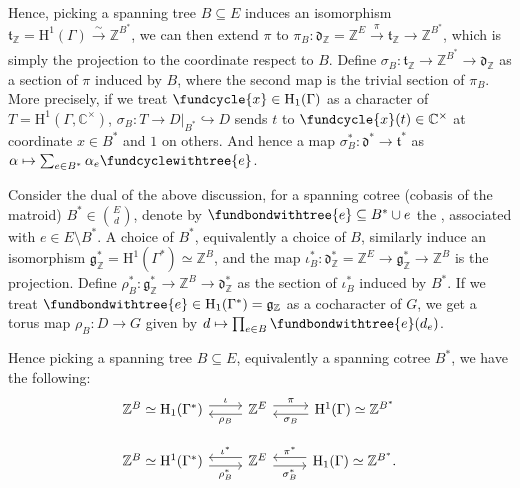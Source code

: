\documentclass[b5paper]{article}
\newcommand{\del}{\setminus}
\newcommand{\HH}{\mathrm{H}}
\begin{document}
Hence, picking a spanning tree $B\subseteq E$ induces an isomorphism $\mathfrak{t}_\mathbb{Z}=\HH^1(\Gamma) \xrightarrow[]{\sim }\mathbb{Z}^{B^*}$, we can then extend $\pi$ to $\pi_B:\mathfrak{d}_\mathbb{Z}=\mathbb{Z}^E\xrightarrow[]{\pi} \mathfrak{t}_\mathbb{Z}\rightarrow \mathbb{Z}^{B^*}$, which is simply the projection to the coordinate respect to $B$. Define $\sigma_B:\mathfrak{t}_\mathbb{Z}\rightarrow \mathbb{Z}^{B^*}\rightarrow \mathfrak{d}_\mathbb{Z}$ as a section of $\pi$ induced by $B$, where the second map is the trivial section of $\pi_B$.
More precisely, if we treat $\fundcycle{x}\in \HH_1(\Gamma)$ as a character of $T=\HH^1(\Gamma,\mathbb{C}^\times )$, $\sigma_B:T\rightarrow D|_{B^*}\hookrightarrow D$ sends $t$ to $\fundcycle{x}(t)\in \mathbb{C}^\times $ at coordinate ${x\in B^*}$ and $1$ on others. And hence a map $\sigma_B^*:\mathfrak{d}^*\rightarrow \mathfrak{t}^*$ as $\alpha\mapsto \sum_{e\in B^*}^{}\alpha_e\fundcyclewithtree{e}$.

Consider the dual of the above discussion, for a spanning cotree (cobasis of the matroid) $B^*\in \binom{E}{d}$, denote by $\fundbondwithtree{e}\subseteq B^*\cup e$ the , associated with $e\in E\del B^*$.
A choice of $B^*$, equivalently a choice of $B$, similarly induce an isomorphism $\mathfrak{g}_\mathbb{Z}^*=\HH^1(\Gamma^*)\simeq \mathbb{Z}^B$, and the map $\iota^*_B:\mathfrak{d}_\mathbb{Z}^*=\mathbb{Z}^E\rightarrow \mathfrak{g}^*_\mathbb{Z}\rightarrow \mathbb{Z}^B$ is the projection. Define $\rho_B^*:\mathfrak{g}_\mathbb{Z}^*\rightarrow \mathbb{Z}^{B}\rightarrow \mathfrak{d}^*_\mathbb{Z}$ as the section of $\iota^*_B$ induced by $B^*$. If we treat $\fundbondwithtree{e}\in \HH_1(\Gamma^*)=\mathfrak{g}_\mathbb{Z}$ as a cocharacter of $G$, we get a torus map $\rho_B:D\rightarrow G$ given by $d\mapsto \prod_{e\in B}^{}\fundbondwithtree{e}(d_e)$.

Hence picking a spanning tree $B\subseteq E$, equivalently a spanning cotree $B^*$, we have the following:
\begin{equation*}
    \begin{tikzcd}
      \mathbb{Z}^B\simeq \HH_1(\Gamma^*) \arrow[r, "\iota", yshift=0.3em] & \arrow[l, "\rho_B", yshift=-0.3em]\mathbb{Z}^E \arrow[r, "\pi", yshift=0.3em] & \arrow[l, "\sigma_B", yshift=-0.3em] \HH^1(\Gamma)\simeq \mathbb{Z}^{B^*}\\
      \mathbb{Z}^B\simeq \HH^1(\Gamma^*) \arrow[r, "\rho^*_B"', yshift=-0.3em] & \arrow[l, "\iota^*"', yshift=+0.3em]\mathbb{Z}^E \arrow[r, "\sigma_B^*"', yshift=-0.3em] & \arrow[l, "\pi^*"', yshift=0.3em] \HH_1(\Gamma)\simeq \mathbb{Z}^{B^*}.
    \end{tikzcd}
\end{equation*}
\end{document}
